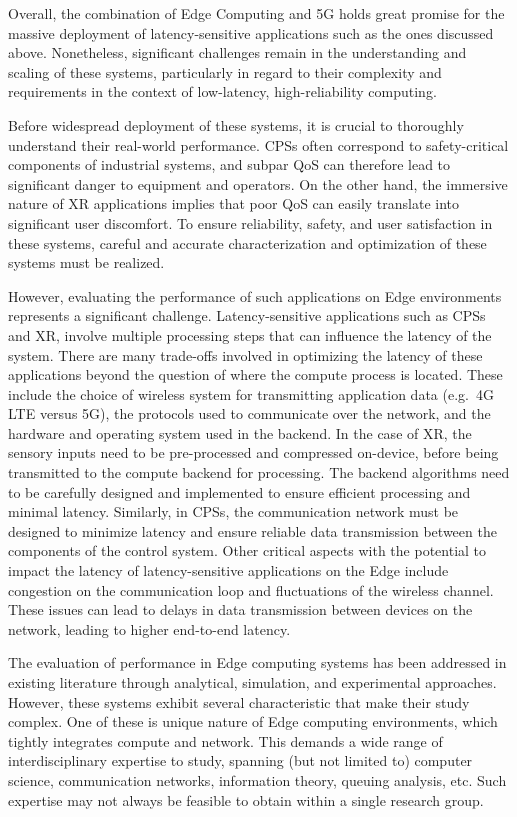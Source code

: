 Overall, the combination of Edge Computing and 5G holds great promise for the massive deployment of latency-sensitive applications such as the ones discussed above.
Nonetheless, significant challenges remain in the understanding and scaling of these systems, particularly in regard to their complexity and requirements in the context of low-latency, high-reliability computing.

Before widespread deployment of these systems, it is crucial to thoroughly understand their real-world performance.
\glspl{CPS} often correspond to safety-critical components of industrial systems, and subpar \gls{QoS} can therefore lead to significant danger to equipment and operators.
On the other hand, the immersive nature of \gls{XR} applications implies that poor \gls{QoS} can easily translate into significant user discomfort.
To ensure reliability, safety, and user satisfaction in these systems, careful and accurate characterization and optimization of these systems must be realized.

However, evaluating the performance of such applications on Edge environments represents a significant challenge.
Latency-sensitive applications such as \glspl{CPS} and \gls{XR}, involve multiple processing steps that can influence the latency of the system.
There are many trade-offs involved in optimizing the latency of these applications beyond the question of where the compute process is located. 
These include the choice of wireless system for transmitting application data (e.g.\ 4G \gls{LTE} versus 5G), the protocols used to communicate over the network, and the hardware and operating system used in the backend.
In the case of \gls{XR}, the sensory inputs need to be pre-processed and compressed on-device, before being transmitted to the compute backend for processing.
The backend algorithms need to be carefully designed and implemented to ensure efficient processing and minimal latency. 
Similarly, in \glspl{CPS}, the communication network must be designed to minimize latency and ensure reliable data transmission between the components of the control system.
Other critical aspects with the potential to impact the latency of latency-sensitive applications on the Edge include congestion on the communication loop and fluctuations of the wireless channel.
These issues can lead to delays in data transmission between devices on the network, leading to higher end-to-end latency.

The evaluation of performance in Edge computing systems has been addressed in existing literature through analytical, simulation, and experimental approaches.
However, these systems exhibit several characteristic that make their study complex.
One of these is unique nature of Edge computing environments, which tightly integrates compute and network.
This demands a wide range of interdisciplinary expertise to study, spanning (but not limited to) computer science, communication networks, information theory, queuing analysis, etc.
Such expertise may not always be feasible to obtain within a single research group.

